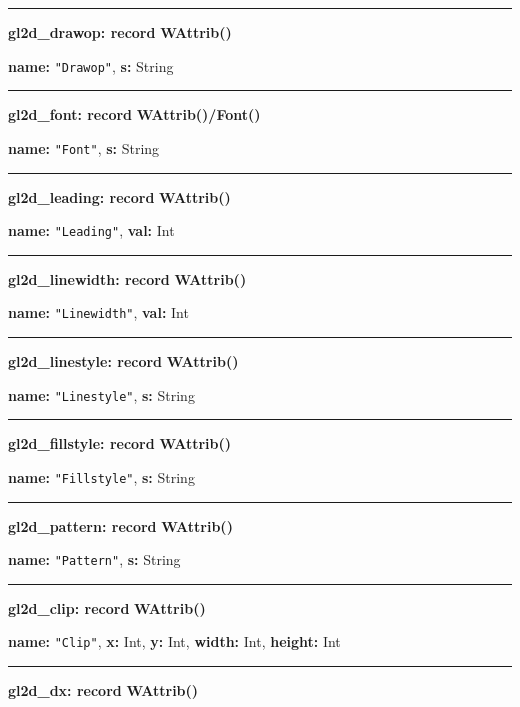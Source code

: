 \documentclass[letterpaper,12pt]{article}
\begin{document}
\bigskip\hrule\vspace{0.1cm}
\noindent
{\bf gl2d\_drawop: record} \hfill {\bf WAttrib()}

{\bf name:} \texttt{"Drawop"},\newline\indent
{\bf s:} String 

\bigskip\hrule\vspace{0.1cm}
\noindent
{\bf gl2d\_font: record} \hfill {\bf WAttrib()/Font()}

{\bf name:} \texttt{"Font"},\newline\indent
{\bf s:} String 

\bigskip\hrule\vspace{0.1cm}
\noindent
{\bf gl2d\_leading: record} \hfill {\bf WAttrib()}

{\bf name:} \texttt{"Leading"},\newline\indent
{\bf val:} Int 

\bigskip\hrule\vspace{0.1cm}
\noindent
{\bf gl2d\_linewidth: record} \hfill {\bf WAttrib()}

{\bf name:} \texttt{"Linewidth"},\newline\indent
{\bf val:} Int 

\bigskip\hrule\vspace{0.1cm}
\noindent
{\bf gl2d\_linestyle: record} \hfill {\bf WAttrib()}

{\bf name:} \texttt{"Linestyle"},\newline\indent
{\bf s:} String 

\bigskip\hrule\vspace{0.1cm}
\noindent
{\bf gl2d\_fillstyle: record} \hfill {\bf WAttrib()}

{\bf name:} \texttt{"Fillstyle"},\newline\indent
{\bf s:} String 

\bigskip\hrule\vspace{0.1cm}
\noindent
{\bf gl2d\_pattern: record} \hfill {\bf WAttrib()}

{\bf name:} \texttt{"Pattern"},\newline\indent
{\bf s:} String

\bigskip\hrule\vspace{0.1cm}
\noindent
{\bf gl2d\_clip: record} \hfill {\bf WAttrib()}

{\bf name:} \texttt{"Clip"},\newline\indent
{\bf x:} Int,
{\bf y:} Int,
{\bf width:} Int,
{\bf height:} Int 

\bigskip\hrule\vspace{0.1cm}
\noindent
{\bf gl2d\_dx: record} \hfill {\bf WAttrib()}
\end{document}
